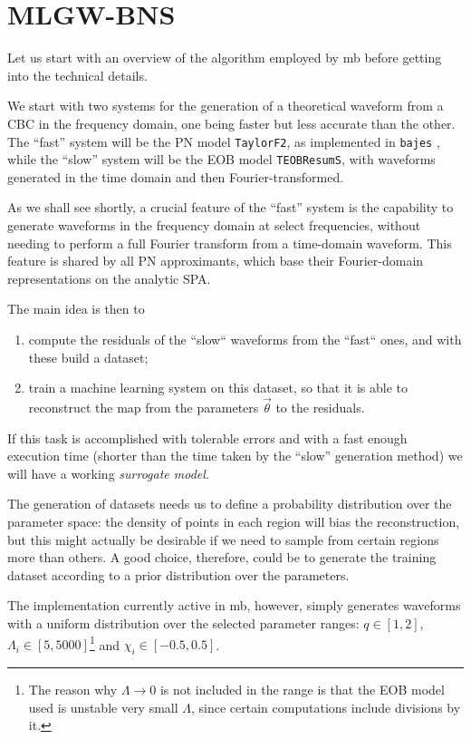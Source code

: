 \documentclass[main.tex]{subfiles}
\begin{document}
\section{MLGW-BNS}

Let us start with an overview of the algorithm employed by \ac{mb} before getting into the technical details. 

We start with two systems for the generation of a theoretical waveform from a \ac{CBC} in the frequency domain, one being faster but less accurate than the other. 
The ``fast'' system will be the \ac{PN} model \texttt{TaylorF2}, as implemented in \texttt{bajes} \cite[]{breschiTtBajesBayesian2021}, while the ``slow'' system will be the \ac{EOB} model \texttt{TEOBResumS}, with waveforms generated in the time domain and then Fourier-transformed.

As we shall see shortly, a crucial feature of the ``fast'' system is the capability to generate waveforms in the frequency domain at select frequencies, without needing to perform a full Fourier transform from a time-domain waveform.
This feature is shared by all \ac{PN} approximants, which base their Fourier-domain representations on the analytic \ac{SPA}.

The main idea is then to 
\begin{enumerate}
    \item compute the residuals of the ``slow`` waveforms from the ``fast`` ones, and with these build a dataset;
    \item train a machine learning system on this dataset, so that it is able to reconstruct the map from the parameters \(\vec{\theta}\) to the residuals.
\end{enumerate}

If this task is accomplished with tolerable errors and with a fast enough execution time (shorter than the time taken by the ``slow'' generation method) we will have a working \emph{surrogate model}. 

The generation of datasets needs us to define a probability distribution over the parameter space: the density of points in each region will bias the reconstruction, but this might actually be desirable if we need to sample from certain regions more than others. 
A good choice, therefore, could be to generate the training dataset according to a prior distribution over the parameters. 

The implementation currently active in \ac{mb}, however, simply generates waveforms with a uniform distribution over the selected parameter ranges: \(q \in [1, 2]\), \(\Lambda _i \in [5, 5000]\)\footnote{The reason why \(\Lambda \to 0\) is not included in the range is that the \ac{EOB} model used is unstable very small \(\Lambda \), since certain computations include divisions by it.} and \(\chi_i \in [-0.5, 0.5]\).
\end{document}
